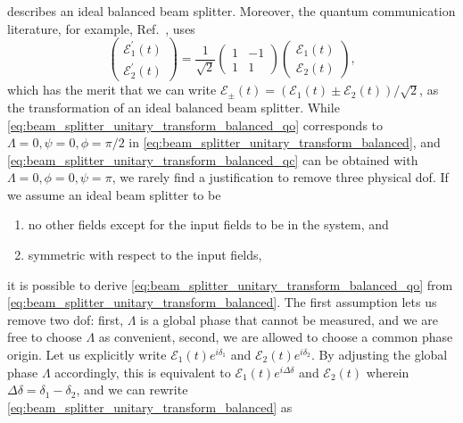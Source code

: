 describes an ideal balanced beam splitter.
Moreover, the quantum communication literature, for example, Ref.~\cite{Shapiro2009}, uses
\begin{equation}
    \begin{pmatrix}
        \mathcal{E}_1^\prime(t)
        \\
        \mathcal{E}_2^\prime(t)
    \end{pmatrix}
    =
    \frac{1}{\sqrt{2}}
    \begin{pmatrix}
        1 & -1\\
        1 & 1
    \end{pmatrix}
    \begin{pmatrix}
        \mathcal{E}_1(t)
        \\
        \mathcal{E}_2(t)
    \end{pmatrix}
    \label{eq:beam_splitter_unitary_transform_balanced_qc},
\end{equation}
which has the merit that we can write $\mathcal{E}_\pm(t)=\left(\mathcal{E}_1(t)\pm\mathcal{E}_2(t)\right)/\sqrt{2}$, as the transformation of an ideal balanced beam splitter.
While \cref{eq:beam_splitter_unitary_transform_balanced_qo} corresponds to $\Lambda=0,\psi=0,\phi=\pi/2$ in \cref{eq:beam_splitter_unitary_transform_balanced}, and \cref{eq:beam_splitter_unitary_transform_balanced_qc} can be obtained with $\Lambda=0,\phi=0,\psi=\pi$, we rarely find a justification to remove three physical \gls{dof}.
If we assume an ideal beam splitter to be
\begin{enumerate}
    \item no other fields except for the input fields to be in the system, and
    \item symmetric with respect to the input fields,
\end{enumerate}
it is possible to derive \cref{eq:beam_splitter_unitary_transform_balanced_qo} from \cref{eq:beam_splitter_unitary_transform_balanced}.
The first assumption lets us remove two \gls{dof}: first, $\Lambda$ is a global phase that cannot be measured, and we are free to choose $\Lambda$ as convenient, second, we are allowed to choose a common phase origin.
Let us explicitly write $\mathcal{E}_1(t)e^{i\delta_1}$ and $\mathcal{E}_2(t)e^{i\delta_2}$.
By adjusting the global phase $\Lambda$ accordingly, this is equivalent to $\mathcal{E}_1(t)e^{i\Delta\delta}$ and $\mathcal{E}_2(t)$ wherein $\Delta\delta=\delta_1-\delta_2$, and we can rewrite \cref{eq:beam_splitter_unitary_transform_balanced} as
